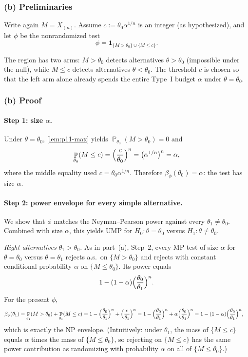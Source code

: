 \documentclass[11pt,a4paper]{article}
\DeclareMathOperator{\Pbb}{\mathbb{P}}
\begin{document}
\subsubsection{(b) Preliminaries}

Write again \(M=X_{(n)}\). Assume \(c:=\theta_0\alpha^{1/n}\) is an integer (as hypothesized), and let \(\phi\) be the nonrandomized test
\[
\phi
=
\mathbf{1}_{\{M>\theta_0\}\cup\{M\le c\}}.
\]

\begin{remark*}
The region has two arms: \(M>\theta_0\) detects alternatives \(\theta>\theta_0\) (impossible under the null), while \(M\le c\) detects alternatives \(\theta<\theta_0\). The threshold \(c\) is chosen so that the left arm alone already spends the entire Type~I budget \(\alpha\) under \(\theta=\theta_0\).
\end{remark*}

\subsubsection{(b) Proof}

\paragraph{Step 1: size \(\alpha\).}
Under \(\theta=\theta_0\), \cref{lem:p11-max} yields \(\Pbb_{\theta_0}(M>\theta_0)=0\) and
\[
\Pbb_{\theta_0}(M\le c)
=
\Bigl(\frac{c}{\theta_0}\Bigr)^n
=
\bigl(\alpha^{1/n}\bigr)^n
=
\alpha,
\]
where the middle equality used \(c=\theta_0\alpha^{1/n}\). Therefore \(\beta_\phi(\theta_0)=\alpha\): the test has size \(\alpha\).

\paragraph{Step 2: power envelope for every simple alternative.}
We show that \(\phi\) matches the Neyman--Pearson power against every \(\theta_1\neq\theta_0\). Combined with size \(\alpha\), this yields UMP for \(H_0:\theta=\theta_0\) versus \(H_1:\theta\neq\theta_0\).

\textit{Right alternatives \(\theta_1>\theta_0\).}
As in part~(a), Step~2, every MP test of size \(\alpha\) for \(\theta=\theta_0\) versus \(\theta=\theta_1\) rejects a.s.\ on \(\{M>\theta_0\}\) and rejects with constant conditional probability \(\alpha\) on \(\{M\le\theta_0\}\). Its power equals
\[
1-(1-\alpha)\Bigl(\frac{\theta_0}{\theta_1}\Bigr)^n.
\]
For the present \(\phi\),
\begin{align*}
\beta_\phi(\theta_1)
&=
\Pbb_{\theta_1}(M>\theta_0)+\Pbb_{\theta_1}(M\le c)
=
1-\Bigl(\frac{\theta_0}{\theta_1}\Bigr)^n
+
\Bigl(\frac{c}{\theta_1}\Bigr)^n
=
1-\Bigl(\frac{\theta_0}{\theta_1}\Bigr)^n
+
\alpha\Bigl(\frac{\theta_0}{\theta_1}\Bigr)^n
=
1-(1-\alpha)\Bigl(\frac{\theta_0}{\theta_1}\Bigr)^n,
\end{align*}
which is exactly the NP envelope. (Intuitively: under \(\theta_1\), the mass of \(\{M\le c\}\) equals \(\alpha\) times the mass of \(\{M\le\theta_0\}\), so rejecting on \(\{M\le c\}\) has the same power contribution as randomizing with probability \(\alpha\) on all of \(\{M\le\theta_0\}\).)
\end{document}
